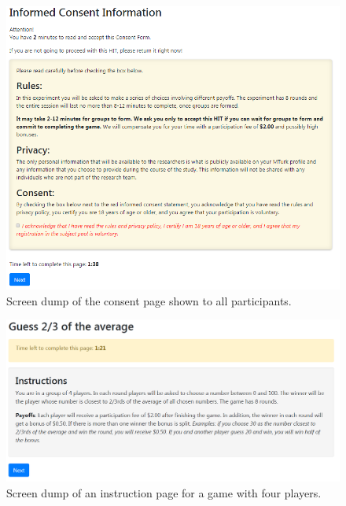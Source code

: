 \begin{figure}
\includegraphics[width=1\textwidth]{../images/FigA1.png}\caption{Screen dump of the consent page shown to all participants.}
\label{Fig S1}
\end{figure}

\begin{figure}
\includegraphics[width=1\textwidth]{../images/FigA2.png}\caption{Screen dump of an instruction page for a game with four players.}
\label{Fig S2}
\end{figure}

